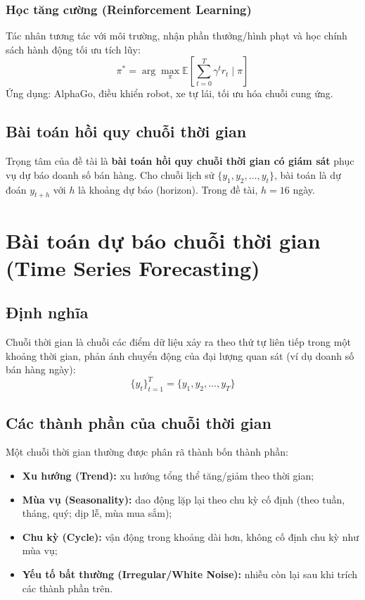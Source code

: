\documentclass[12pt,a4paper]{report}
\begin{document}
\subsubsection{Học tăng cường (Reinforcement Learning)}
Tác nhân tương tác với môi trường, nhận phần thưởng/hình phạt và học chính sách hành động tối ưu tích lũy:
\[
    \pi^* = \arg\max_{\pi} \mathbb{E}\left[\sum_{t=0}^{T} \gamma^t r_t \mid \pi\right]
\]
Ứng dụng: AlphaGo, điều khiển robot, xe tự lái, tối ưu hóa chuỗi cung ứng.

\subsection{Bài toán hồi quy chuỗi thời gian}
Trọng tâm của đề tài là \textbf{bài toán hồi quy chuỗi thời gian có giám sát} phục vụ dự báo doanh số bán hàng. Cho chuỗi lịch sử $\{y_1, y_2, \ldots, y_t\}$, bài toán là dự đoán $y_{t+h}$ với $h$ là khoảng dự báo (horizon). Trong đề tài, $h = 16$ ngày.

\section{Bài toán dự báo chuỗi thời gian (Time Series Forecasting)}

\subsection{Định nghĩa}
Chuỗi thời gian là chuỗi các điểm dữ liệu xảy ra theo thứ tự liên tiếp trong một khoảng thời gian, phản ánh chuyển động của đại lượng quan sát (ví dụ doanh số bán hàng ngày):
\[
    \{y_t\}_{t=1}^{T} = \{y_1, y_2, \ldots, y_T\}
\]

\subsection{Các thành phần của chuỗi thời gian}
Một chuỗi thời gian thường được phân rã thành bốn thành phần:
\begin{itemize}
    \item \textbf{Xu hướng (Trend):} xu hướng tổng thể tăng/giảm theo thời gian;
    \item \textbf{Mùa vụ (Seasonality):} dao động lặp lại theo chu kỳ cố định (theo tuần, tháng, quý; dịp lễ, mùa mua sắm);
    \item \textbf{Chu kỳ (Cycle):} vận động trong khoảng dài hơn, không cố định chu kỳ như mùa vụ;
    \item \textbf{Yếu tố bất thường (Irregular/White Noise):} nhiễu còn lại sau khi trích các thành phần trên.
\end{itemize}
\end{document}
